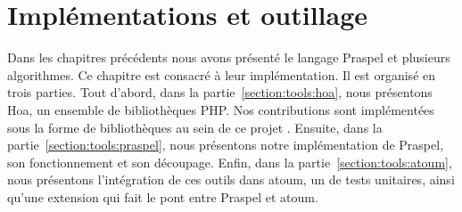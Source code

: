 \chapter{Implémentations et outillage}
\label{chapter:tools}

\mminitoc

Dans les chapitres précédents nous avons présenté le langage Praspel et
plusieurs algorithmes. Ce chapitre est consacré à leur implémentation. Il est
organisé en trois parties. Tout d'abord, dans la partie~\ref{section:tools:hoa},
nous présentons Hoa, un ensemble de bibliothèques PHP. Nos contributions sont
implémentées sous la forme de bibliothèques au sein de ce projet
. Ensuite, dans la partie~\ref{section:tools:praspel},
nous présentons notre implémentation de Praspel, son fonctionnement et son
découpage. Enfin, dans la partie~\ref{section:tools:atoum}, nous présentons
l'intégration de ces outils dans atoum, un  de tests
unitaires, ainsi qu'une extension qui fait le pont entre Praspel et atoum.

